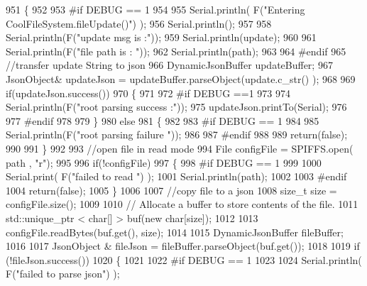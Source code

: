 \begin{DoxyCode}
951 \{
952 
953 \textcolor{preprocessor}{#if DEBUG == 1}
954 
955     Serial.println( F(\textcolor{stringliteral}{"Entering CoolFileSystem.fileUpdate()"}) );
956     Serial.println();
957     
958     Serial.println(F(\textcolor{stringliteral}{"update msg is :"}));
959     Serial.println(update);
960     
961     Serial.println(F(\textcolor{stringliteral}{"file path is : "}));
962     Serial.println(path);   
963 
964 \textcolor{preprocessor}{#endif}
965     \textcolor{comment}{//transfer update String to json}
966     DynamicJsonBuffer updateBuffer;
967     JsonObject& updateJson = updateBuffer.parseObject(update.c\_str() );
968     
969     \textcolor{keywordflow}{if}(updateJson.success())
970     \{
971     
972 \textcolor{preprocessor}{    #if DEBUG ==1}
973         
974         Serial.println(F(\textcolor{stringliteral}{"root parsing success :"}));
975         updateJson.printTo(Serial);
976     
977 \textcolor{preprocessor}{    #endif}
978 
979     \}
980     \textcolor{keywordflow}{else}
981     \{
982     
983 \textcolor{preprocessor}{    #if DEBUG == 1 }
984     
985         Serial.println(F(\textcolor{stringliteral}{"root parsing failure "}));
986     
987 \textcolor{preprocessor}{    #endif}
988         
989         \textcolor{keywordflow}{return}(\textcolor{keyword}{false});  
990 
991     \}
992     
993     \textcolor{comment}{//open file in read mode}
994     File configFile = SPIFFS.open( path , \textcolor{stringliteral}{"r"});
995     
996     \textcolor{keywordflow}{if}(!configFile)
997     \{   
998 \textcolor{preprocessor}{    #if DEBUG == 1}
999         
1000         Serial.print( F(\textcolor{stringliteral}{"failed to read "}) );
1001         Serial.println(path);
1002 
1003 \textcolor{preprocessor}{    #endif}
1004         \textcolor{keywordflow}{return}(\textcolor{keyword}{false});
1005     \}
1006 
1007     \textcolor{comment}{//copy file to a json}
1008     \textcolor{keywordtype}{size\_t} size = configFile.size();
1009 
1010     \textcolor{comment}{// Allocate a buffer to store contents of the file.}
1011     std::unique\_ptr < char[] > buf(\textcolor{keyword}{new} \textcolor{keywordtype}{char}[size]);
1012 
1013     configFile.readBytes(buf.get(), size);
1014 
1015     DynamicJsonBuffer fileBuffer;
1016 
1017     JsonObject & fileJson = fileBuffer.parseObject(buf.get());
1018 
1019     \textcolor{keywordflow}{if} (!fileJson.success())
1020     \{
1021 
1022 \textcolor{preprocessor}{    #if DEBUG == 1}
1023 
1024         Serial.println( F(\textcolor{stringliteral}{"failed to parse json"}) );

\end{DoxyCode}
